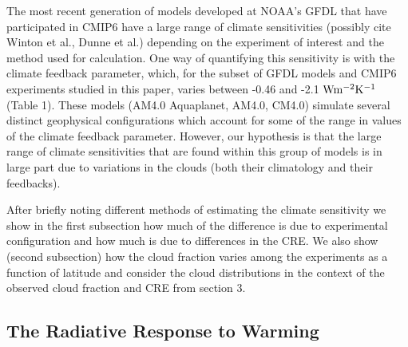 \documentclass[draft]{agujournal2019}
\begin{document}

The most recent generation of models developed at NOAA's GFDL that have participated in CMIP6 have a large range of climate 
sensitivities (possibly cite Winton et al., Dunne et al.) depending on the experiment of interest and the method used for 
calculation.  One way of quantifying this sensitivity is with the climate feedback parameter, which, for the subset of GFDL models and CMIP6 experiments studied in this paper, varies between -0.46 and -2.1 $\rm{W m^{-2}K^{-1}}$ (Table 1).  
These models (AM4.0 Aquaplanet, AM4.0, CM4.0) simulate several 
distinct geophysical configurations which account for some of the range in values of the climate feedback parameter.  
However, our hypothesis is that the large range of climate sensitivities that are found within this 
group of models is in large part due to variations in the clouds (both their climatology and their feedbacks).


After briefly noting different methods of estimating the climate sensitivity we show in the first subsection how much of the difference is 
due to experimental configuration and how much is due to differences in the CRE.  
We also show (second subsection) how the cloud fraction varies among
the experiments as a function of latitude and consider the cloud distributions in the context of the observed
cloud fraction and CRE from section 3.  

\subsection{The Radiative Response to Warming}
\end{document}
